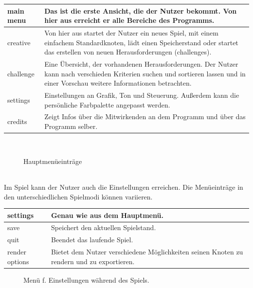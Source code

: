 	\begin{longtable}{|p{}|p{}|}
    \hline
    main menu & Das ist die erste Ansicht, die der Nutzer bekommt. Von hier aus erreicht er alle Bereiche des Programms.\\
    \hline
    creative & Von hier aus startet der Nutzer ein neues Spiel, mit einem einfachem Standardknoten, lädt einen Speicherstand oder startet das erstellen von neuen Herausforderungen (challenges).\\
    \hline
    challenge & Eine Übersicht, der vorhandenen Herausforderungen. Der Nutzer kann nach verschieden Kriterien suchen und sortieren lassen und in einer Vorschau weitere Informationen betrachten.\\
    \hline
    settings & Einstellungen an Grafik, Ton und Steuerung. Außerdem kann die persönliche Farbpalette angepasst werden.\\
    \hline
    credits & Zeigt Infos über die Mitwirkenden an dem Programm und über das Programm selber.\\
    \hline
    
   \end{longtable}
   
   ~\\
    
	\begin{figure}[h]
		\centering
	 	
	 	\caption{Hauptmenüeinträge}
	\end{figure}
	
	\clearpage
	~\\
	
	Im Spiel kann der Nutzer auch die {\color{red} Einstellungen} erreichen. Die Menüeinträge in den unterschiedlichen Spielmodi können variieren.

	\begin{longtable}{|p{}|p{}|}
	
	\hline
	settings & Genau wie aus dem Hauptmenü.\\
	\hline
	save & Speichert den aktuellen Spielstand.\\
	\hline
	quit & Beendet das laufende Spiel. \\
	\hline
	render options & Bietet dem Nutzer verschiedene Möglichkeiten seinen Knoten zu rendern und zu exportieren.\\
	\hline
	
	\end{longtable}
	
	\begin{figure}[!ht]
		  \centering
		  
		  \caption{Menü f. Einstellungen während des Spiels.}
	\end{figure}

